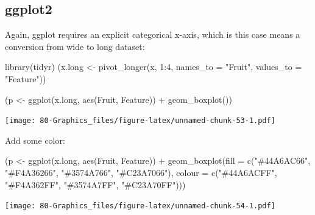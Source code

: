 \documentclass[
]{book}
\newenvironment{Shaded}{\begin{snugshade}}{\end{snugshade}}
\newcommand{\AttributeTok}[1]{\textcolor[rgb]{0.77,0.63,0.00}{#1}}
\newcommand{\DecValTok}[1]{\textcolor[rgb]{0.00,0.00,0.81}{#1}}
\newcommand{\FunctionTok}[1]{\textcolor[rgb]{0.00,0.00,0.00}{#1}}
\newcommand{\NormalTok}[1]{#1}
\newcommand{\OtherTok}[1]{\textcolor[rgb]{0.56,0.35,0.01}{#1}}
\newcommand{\SpecialCharTok}[1]{\textcolor[rgb]{0.00,0.00,0.00}{#1}}
\newcommand{\StringTok}[1]{\textcolor[rgb]{0.31,0.60,0.02}{#1}}
\begin{document}
\hypertarget{ggplot2-6}{%
\subsection{\texorpdfstring{\textbf{ggplot2}}{ggplot2}}\label{ggplot2-6}}

Again, ggplot requires an explicit categorical x-axis, which is this case means a conversion from wide to long dataset:

\begin{Shaded}
\begin{Highlighting}[]
\FunctionTok{library}\NormalTok{(tidyr)}
\NormalTok{(x.long }\OtherTok{\textless{}{-}} \FunctionTok{pivot\_longer}\NormalTok{(x, }\DecValTok{1}\SpecialCharTok{:}\DecValTok{4}\NormalTok{, }\AttributeTok{names\_to =} \StringTok{"Fruit"}\NormalTok{, }\AttributeTok{values\_to =} \StringTok{"Feature"}\NormalTok{))}
\end{Highlighting}
\end{Shaded}

\begin{Shaded}
\begin{Highlighting}[]
\NormalTok{(p }\OtherTok{\textless{}{-}} \FunctionTok{ggplot}\NormalTok{(x.long, }\FunctionTok{aes}\NormalTok{(Fruit, Feature)) }\SpecialCharTok{+} \FunctionTok{geom\_boxplot}\NormalTok{())}
\end{Highlighting}
\end{Shaded}

\texttt{[image: 80-Graphics\_files/figure-latex/unnamed-chunk-53-1.pdf]}

Add some color:

\begin{Shaded}
\begin{Highlighting}[]
\NormalTok{(p }\OtherTok{\textless{}{-}} \FunctionTok{ggplot}\NormalTok{(x.long, }\FunctionTok{aes}\NormalTok{(Fruit, Feature)) }\SpecialCharTok{+}
   \FunctionTok{geom\_boxplot}\NormalTok{(}\AttributeTok{fill =} \FunctionTok{c}\NormalTok{(}\StringTok{"\#44A6AC66"}\NormalTok{, }\StringTok{"\#F4A36266"}\NormalTok{, }\StringTok{"\#3574A766"}\NormalTok{, }\StringTok{"\#C23A7066"}\NormalTok{),}
                \AttributeTok{colour =} \FunctionTok{c}\NormalTok{(}\StringTok{"\#44A6ACFF"}\NormalTok{, }\StringTok{"\#F4A362FF"}\NormalTok{, }\StringTok{"\#3574A7FF"}\NormalTok{, }\StringTok{"\#C23A70FF"}\NormalTok{)))}
\end{Highlighting}
\end{Shaded}

\texttt{[image: 80-Graphics\_files/figure-latex/unnamed-chunk-54-1.pdf]}
\end{document}
